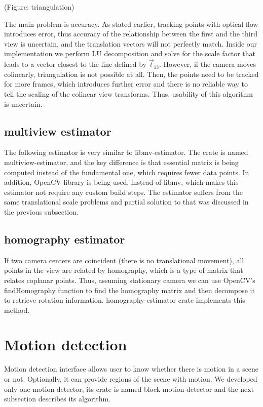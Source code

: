\documentclass[11pt,english]{report}
\begin{document}
(Figure: triangulation)

The main problem is accuracy. As stated earlier, tracking points with optical flow introduces error, thus accuracy of the relationship between the first and the third view is uncertain, and the translation vectors will not perfectly match. Inside our implementation we perform LU decomposition and solve for the scale factor that leads to a vector closest to the line defined by $\overrightarrow{t}_{13}$. However, if the camera moves colinearly, triangulation is not possible at all. Then, the points need to be tracked for more frames, which introduces further error and there is no reliable way to tell the scaling of the colinear view transforms. Thus, usability of this algorithm is uncertain.

\subsection{multiview estimator}

The following estimator is very similar to libmv-estimator. The crate is named multiview-estimator, and the key difference is that essential matrix is being computed instead of the fundamental one, which requires fewer data points. In addition, OpenCV library is being used, instead of libmv, which makes this estimator not require any custom build steps. The estimator suffers from the same translational scale problems and partial solution to that was discussed in the previous subsection.

\subsection{homography estimator}

If two camera centers are coincident (there is no translational movement), all points in the view are related by homography\cite{hartley_zisserman_2004}, which is a type of matrix that relates coplanar points. Thus, assuming stationary camera we can use OpenCV's findHomography function to find the homography matrix and then decompose it to retrieve rotation information. homography-estimator crate implements this method.

\section{Motion detection}

Motion detection interface allows user to know whether there is motion in a scene or not. Optionally, it can provide regions of the scene with motion. We developed only one motion detector, its crate is named block-motion-detector and the next subsection describes its algorithm.
\end{document}
